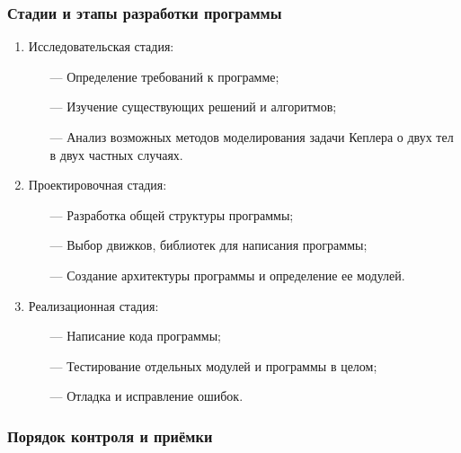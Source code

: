  \begin{center}\subsubsection*{Стадии и этапы разработки программы}\end{center}
 \hspace{0pt}\newline
 \begin{enumerate}
  \item Исследовательская стадия:
   \begin{itemize}
    \item[—] Определение требований к программе;
    \item[—] Изучение существующих решений и алгоритмов;
    \item[—] Анализ возможных методов моделирования задачи Кеплера о двух тел в двух частных случаях.
   \end{itemize}
     \item Проектировочная стадия:
   \begin{itemize}
    \item[—] Разработка общей структуры программы;
    \item[—] Выбор движков, библиотек для написания программы;
    \item[—] Создание архитектуры программы и определение ее модулей.
   \end{itemize}
     \item Реализационная стадия:
   \begin{itemize}
    \item[—] Написание кода программы;
    \item[—] Тестирование отдельных модулей и программы в целом;
    \item[—] Отладка и исправление ошибок.\newline
   \end{itemize}
 \end{enumerate}



 \begin{center}\subsubsection*{Порядок контроля и приёмки}\end{center}

